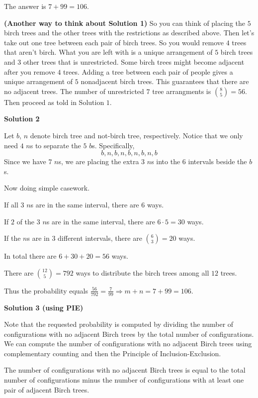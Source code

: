 \begin{enumerate}
 The answer is $7 + 99 = \boxed{106}$.

 


 \textbf{(Another way to think about Solution 1)} So you can think of placing the $5$ birch trees and the other trees with the restrictions as described above. Then let's take out one tree between each pair of birch trees. So you would remove $4$ trees that aren't birch. What you are left with is a unique arrangement of $5$ birch trees and $3$ other trees that is unrestricted. Some birch trees might become adjacent after you remove $4$ trees. Adding a tree between each pair of people gives a unique arrangement of $5$ nonadjacent birch trees. This guarantees that there are no adjacent trees. The number of unrestricted $7$ tree arrangments is ${8\choose5} = 56$. Then proceed as told in Solution $1$. 

 



\textbf{Solution 2}

Let $b$, $n$ denote birch tree and not-birch tree, respectively. Notice that we only need $4$ $n$s to separate the $5$ $b$s. Specifically,
 \[b,n,b,n,b,n,b,n,b\]Since we have $7$ $n$s, we are placing the extra $3$ $n$s into the $6$ intervals beside the $b$s.

 Now doing simple casework.

 If all $3$ $n$s are in the same interval, there are $6$ ways.

 If $2$ of the $3$ $n$s are in the same interval, there are $6\cdot5=30$ ways.

 If the $n$s are in $3$ different intervals, there are ${6 \choose 3} =20$ ways.

 In total there are $6+30+20=56$ ways.

 There are ${12\choose5}=792$ ways to distribute the birch trees among all $12$ trees.

 Thus the probability equals $\frac{56}{792}=\frac{7}{99}\Longrightarrow m+n=7+99=\boxed{106}$.

 



\textbf{Solution 3 (using PIE)}

Note that the requested probability is computed by dividing the number of configurations with no adjacent Birch trees by the total number of configurations. We can compute the number of configurations with no adjacent Birch trees using complementary counting and then the Principle of Inclusion-Exclusion.

 The number of configurations with no adjacent Birch trees is equal to the total number of configurations minus the number of configurations with at least one pair of adjacent Birch trees. 


\end{enumerate}

